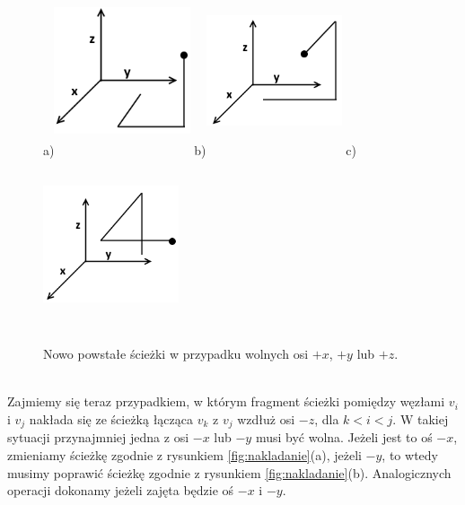 \documentclass[brudnopis]{xmgr}
\theoremstyle{definition}
\begin{document}
\begin{figure}[ht!]
  \centering
  a)\includegraphics[width=4cm,height=5cm]{rysunki/wolne_x.png}
  b)\includegraphics[width=4cm,height=5cm]{rysunki/wolne_y.png}
  c)\includegraphics[width=4cm,height=5cm]{rysunki/wolne_z.png}
  \caption{Nowo powstałe ścieżki w przypadku wolnych osi $+x$, $+y$ lub $+z$.}
  \label{fig:nowe sciezki}
\end{figure} 
\\\indent Zajmiemy się teraz przypadkiem, w którym fragment ścieżki pomiędzy węzłami $v_i$ i $v_j$ nakłada się ze ścieżką łącząca $v_k$ z $v_j$ wzdłuż osi $-z$, dla $k < i < j$. W takiej sytuacji przynajmniej jedna z osi $-x$ lub $-y$ musi być wolna. Jeżeli jest to oś $-x$, zmieniamy ścieżkę zgodnie z rysunkiem \ref{fig:nakladanie}(a), jeżeli $-y$, to wtedy musimy poprawić ścieżkę zgodnie z rysunkiem \ref{fig:nakladanie}(b). Analogicznych operacji dokonamy jeżeli zajęta będzie oś $-x$ i $-y$.
\end{document}
